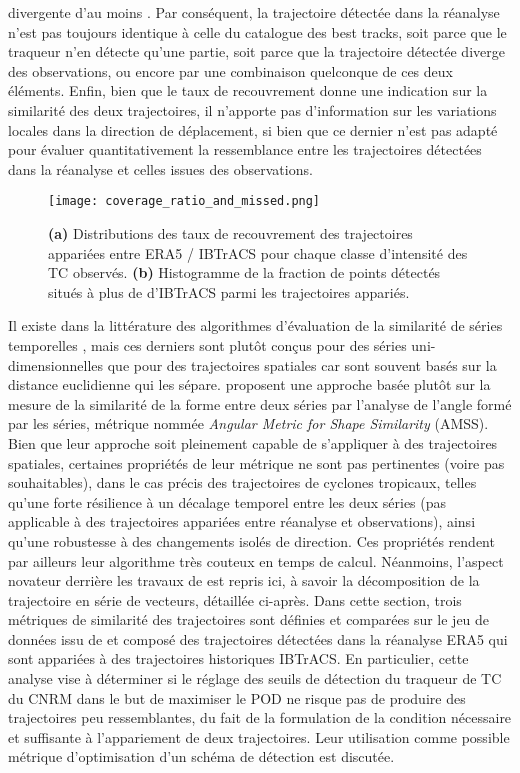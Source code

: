 \documentclass[../main.tex]{subfiles}
\begin{document}
divergente d'au moins . Par conséquent, la trajectoire détectée dans la réanalyse n'est pas toujours identique à celle du catalogue des best tracks,
soit parce que le traqueur n'en détecte qu'une partie, soit parce que la trajectoire détectée diverge des observations, ou encore par une combinaison quelconque
de ces deux éléments. Enfin, bien que le taux de recouvrement donne une indication sur la similarité des deux trajectoires, il n'apporte pas d'information sur
les variations locales dans la direction de déplacement, si bien que ce dernier n'est pas adapté pour évaluer quantitativement la ressemblance entre les
trajectoires détectées dans la réanalyse et celles issues des observations.

\begin{figure}[tb]
    \centering
    \texttt{[image: coverage\_ratio\_and\_missed.png]}
    \caption{\textbf{(a)} Distributions des taux de recouvrement des trajectoires appariées entre ERA5 / IBTrACS pour chaque classe d'intensité des TC observés.
    \textbf{(b)} Histogramme de la fraction de points détectés situés à plus de  d'IBTrACS parmi les trajectoires appariés.}
    \label{fig:coverage_ratio}
\end{figure}

Il existe dans la littérature des algorithmes d'évaluation de la similarité de séries temporelles
\parencite{faloutsos_fast_1994,das_finding_1997,frentzos_indexbased_2007}, mais ces derniers sont plutôt conçus pour des séries uni-dimensionnelles que pour des
trajectoires spatiales car sont souvent basés sur la distance euclidienne qui les sépare. \cite{nakamura_shapebased_2013} proposent une approche basée plutôt
sur la mesure de la similarité de la forme entre deux séries par l'analyse de l'angle formé par les séries, métrique nommée \textit{Angular Metric for Shape
Similarity} (AMSS). Bien que leur approche soit pleinement capable de s'appliquer à des trajectoires spatiales, certaines propriétés de leur métrique ne sont
pas pertinentes (voire pas souhaitables), dans le cas précis des trajectoires de cyclones tropicaux, telles qu'une forte résilience à un décalage temporel entre
les deux séries (pas applicable à des trajectoires appariées entre réanalyse et observations), ainsi qu'une robustesse à des changements isolés de direction.
Ces propriétés rendent par ailleurs leur algorithme très couteux en temps de calcul. Néanmoins, l'aspect novateur derrière les travaux de
\cite{nakamura_shapebased_2013} est repris ici, à savoir la décomposition de la trajectoire en série de vecteurs, détaillée ci-après. Dans cette section, trois
métriques de similarité des trajectoires sont définies et comparées sur le jeu de données issu de \cite{dulac_assessing_2023} et composé des trajectoires
détectées dans la réanalyse ERA5 qui sont appariées à des trajectoires historiques IBTrACS. En particulier, cette analyse vise à déterminer si le réglage des
seuils de détection du traqueur de TC du CNRM dans le but de maximiser le POD ne risque pas de produire des trajectoires peu ressemblantes, du fait de la
formulation de la condition nécessaire et suffisante à l'appariement de deux trajectoires. Leur utilisation comme possible métrique d'optimisation d'un schéma
de détection est discutée.
\end{document}
